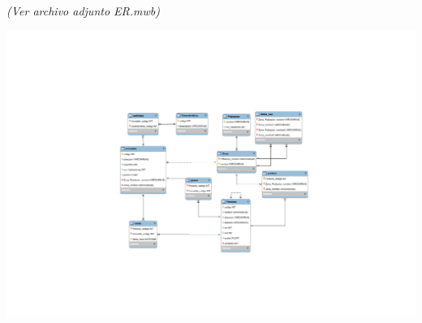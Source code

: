 \documentclass[12pt]{article}
\begin{document}
\textit{(Ver archivo adjunto ER.mwb)}

\vspace{3cm}
\hspace{-7cm}
\includegraphics[scale=.8, trim=0.5cm 11cm 0.5cm 11cm]{ER.pdf}
\end{document}
